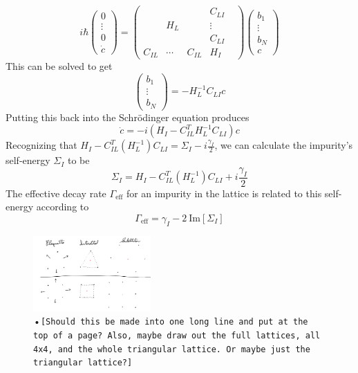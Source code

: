 \documentclass[aps,pra,superscriptaddress,twocolumn]{revtex4-1}
\newcommand{\im}{\mathrm{Im}}
\newcommand{\commentSB}[1]{\texttt{\color{blue}[#1]}}
\begin{document}
\begin{equation} i \hbar 
    \begin{pmatrix}
    0 \\ \vdots \\ 0 \\ \dot{c}
    \end{pmatrix} = \begin{pmatrix}
        ~ & ~ & ~ &   C_{LI} \\ 
        ~ & H_L & ~ & \vdots \\
        ~ & ~ & ~ & C_{LI} & \\
        C_{IL} & \cdots & C_{IL} & H_I   
    \end{pmatrix} \begin{pmatrix}
        b_1 \\ \vdots \\ b_N \\ c
    \end{pmatrix} 
\end{equation}
This can be solved to get 
\begin{equation}
    \begin{pmatrix}
        b_1 \\ \vdots \\ b_N
    \end{pmatrix} = - H_L^{-1} C_{LI} c
\end{equation}
Putting this back into the Schr\"odinger equation produces 
\begin{equation}
    \dot{c} = -i (H_I - C_{IL}^T H_L^{-1}C_{LI}) c
\end{equation}
Recognizing that $ H_I - C_{IL}^T (H_L^{-1}) C_{LI} = \Sigma_I - i \frac{\gamma_I}{2} $, we can calculate the impurity's self-energy $\Sigma_I$ to be 
\begin{equation}
    \Sigma_I = H_I - C_{IL}^T (H_L^{-1}) C_{LI} + i \frac{\gamma_I}{2}
    \label{eqn:selfenergy}
\end{equation}
The effective decay rate $\Gamma_\text{eff}$ for an impurity in the lattice is related to this self-energy according to 
\begin{equation}
    \Gamma_\text{eff} = \gamma_I - 2~\im[\Sigma_I]
\end{equation}

\begin{figure}
    \centering
    \includegraphics[width=0.4\textwidth]{figures/triangle_and_square.png} 
    \caption{•\commentSB{Should this be made into one long line and put at the top of a page? Also, maybe draw out the full lattices, all 4x4, and the whole triangular lattice. Or maybe just the triangular lattice?}}
    \label{fig:Bravais}
\end{figure}
\end{document}
